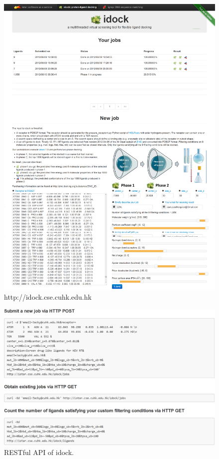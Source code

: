 \documentclass[10pt]{article}
\begin{document}
\pagebreak
\begin{figure}
\centering
\includegraphics[width=\linewidth]{idock.png}
\caption{http://idock.cse.cuhk.edu.hk}
\label{istar:idock}
\end{figure}

\pagebreak
\begin{figure}
\centering
\includegraphics[width=\linewidth]{idock-rest.png}
\caption{RESTful API of idock.}
\label{istar:idock-rest}
\end{figure}
\end{document}
